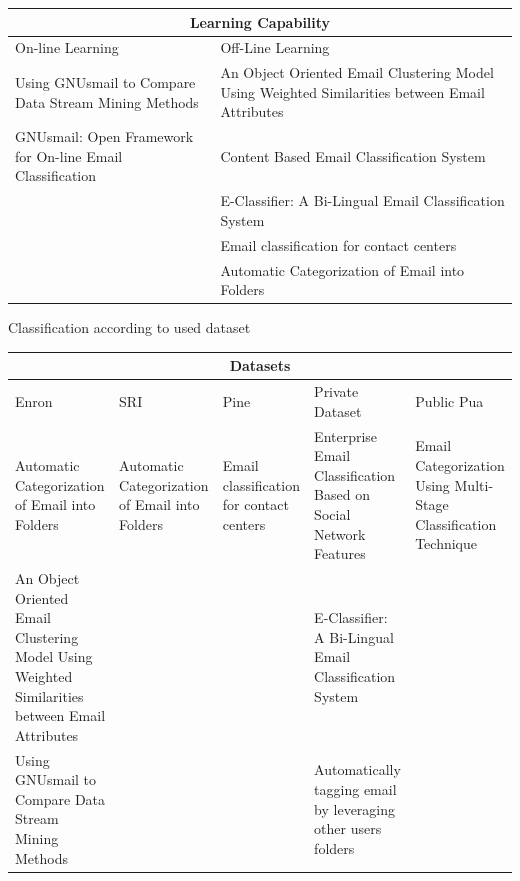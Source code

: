 \documentclass[12pt]{article}
\begin{document}
\begin{center}
\begin{tabular}{|p{6cm}|p{6cm}|}
\hline
\multicolumn{2}{|c|}{Learning Capability} \\
\hline
On-line Learning & Off-Line Learning 
\\ \hline
Using GNUsmail to Compare Data Stream Mining Methods

&  An Object Oriented Email Clustering Model Using  Weighted Similarities between Email Attributes
\\ \hline

GNUsmail: Open Framework for On-line Email Classification
& Content Based Email Classification System
\\ \hline

& E-Classifier: A Bi-Lingual Email Classification System
\\ \hline

& Email classification for contact centers
\\ \hline

& 
Automatic Categorization of Email into Folders

\\ \hline

\end{tabular}
\end{center}

\newpage

Classification according to used dataset
\\

\begin{center}
\begin{tabular}{|p{2.5cm}|p{2.5cm}|p{2.5cm}|p{2.5cm}|p{2.5cm}|}
\hline
\multicolumn{5}{|c|}{Datasets} \\
\hline
Enron & SRI & Pine & Private Dataset & Public Pua
\\ \hline
Automatic Categorization of Email into Folders &
Automatic Categorization of Email into Folders & Email classification for contact centers &
Enterprise Email Classification Based on Social Network Features & Email Categorization Using Multi-Stage Classification Technique
\\ \hline
An Object Oriented Email Clustering Model Using  Weighted Similarities between Email Attributes &
& & E-Classifier: A Bi-Lingual Email Classification System &
\\ \hline
Using GNUsmail to Compare Data Stream Mining Methods & & &Automatically tagging email by leveraging other users folders & 
\\ \hline
\end{tabular}
\end{center}
\end{document}
